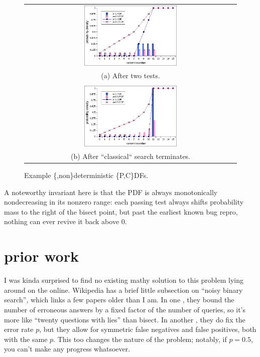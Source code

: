 \documentclass[11pt]{sigplanconf}
\begin{document}
% 
% 

% 
% 

\begin{figure}[t]
	\begin{tabular}{c}
	\includegraphics[width=0.45\textwidth]{example.pdf}
	\\
		(a) After two tests.
		\\
		\\

	\includegraphics[width=0.45\textwidth]{example2.pdf}
	\\
		(b) After ``classical`` search terminates.
	\end{tabular}
	\caption{Example \{,non\}deterministic \{P,C\}DFs.}
	\label{fig:example}
\end{figure}

A noteworthy invariant here is that the PDF is always monotonically nondecreasing in its nonzero range:
each passing test always shifts probability mass to the right of the bisect point,
but past the earliest known bug repro, nothing can ever revive it back above 0.


\section{prior work}

I was kinda surprised to find no existing mathy solution to this problem lying around on the online.
Wikipedia has a brief little subsection on ``noisy binary search'', which links a few papers older than I am.
In one \cite{noisy2}, they bound the number of erroneous answers by a fixed factor of the number of queries,
so it's more like ``twenty questions with lies'' than bisect.
In another \cite{noisy1}, they do fix the error rate $p$,
but they allow for symmetric false negatives and false positives, both with the same $p$.
This too changes the nature of the problem;
notably, if $p=0.5$, you can't make any progress whatsoever.
\end{document}
